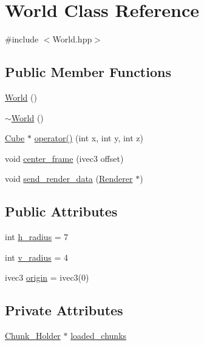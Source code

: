 \hypertarget{classWorld}{}\section{World Class Reference}
\label{classWorld}


{\ttfamily \#include $<$World.\+hpp$>$}

\subsection*{Public Member Functions}
\begin{DoxyCompactItemize}
\item 
\mbox{\hyperlink{classWorld_afa39d4e6f714a7a3691ac0c656f5e8a8}{World}} ()
\item 
\mbox{\hyperlink{classWorld_a8c73fba541a5817fff65147ba47cd827}{$\sim$\+World}} ()
\item 
\mbox{\hyperlink{classCube}{Cube}} $\ast$ \mbox{\hyperlink{classWorld_ade33d093b4560af74cec4fa9264cf078}{operator()}} (int x, int y, int z)
\item 
void \mbox{\hyperlink{classWorld_a867700693b18b37cc9b5a1b8ba818286}{center\+\_\+frame}} (ivec3 offset)
\item 
void \mbox{\hyperlink{classWorld_af79323774823279380a7db9d61ed8028}{send\+\_\+render\+\_\+data}} (\mbox{\hyperlink{classRenderer}{Renderer}} $\ast$)
\end{DoxyCompactItemize}
\subsection*{Public Attributes}
\begin{DoxyCompactItemize}
\item 
int \mbox{\hyperlink{classWorld_aeb621b5ca0eba8ee3d0a1d2bfa11b278}{h\+\_\+radius}} = 7
\item 
int \mbox{\hyperlink{classWorld_a055ae0d6d9a2a5f0cc891cc77157a48a}{v\+\_\+radius}} = 4
\item 
ivec3 \mbox{\hyperlink{classWorld_a832a85c0faf5e0e71a26265e1d893285}{origin}} = ivec3(0)
\end{DoxyCompactItemize}
\subsection*{Private Attributes}
\begin{DoxyCompactItemize}
\item 
\mbox{\hyperlink{classChunk__Holder}{Chunk\+\_\+\+Holder}} $\ast$ \mbox{\hyperlink{classWorld_a712003d390612b1c123013db8dcabc75}{loaded\+\_\+chunks}}
\end{DoxyCompactItemize}


